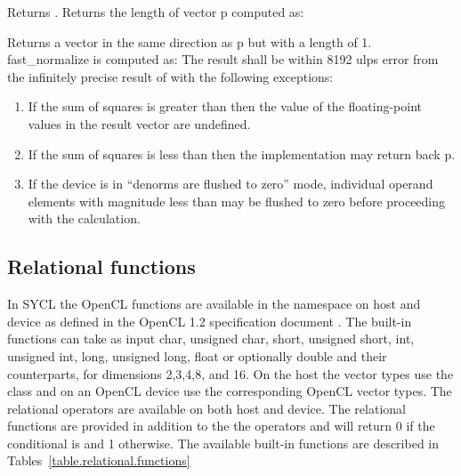{
Returns .
}
{
Returns the length of vector p computed as:
}
{
Returns a vector in the same direction as p but with a
length of 1. fast_normalize is computed as:
\newline
The result shall be within 8192 ulps error from the
infinitely precise result of
\newline
{}\newline
{}\newline
{}\newline
with the following exceptions:
\begin{enumerate}
\item If the sum of squares is greater than 
then the value of the floating-point values in the
result vector are undefined.

\item If the sum of squares is less than  then
the implementation may return back p.

\item If the device is in ``denorms are flushed to zero''
mode, individual operand elements with magnitude
less than  may be flushed to zero
before proceeding with the calculation.
\end{enumerate}
}
\completeTable

\subsection{Relational functions}

In SYCL the OpenCL  functions are available in the namespace
 on host and device as defined in the OpenCL 1.2 specification
document \cite[par. 6.12.6]{opencl12}. The built-in functions can take as input
char, unsigned char, short, unsigned short, int, unsigned int, long, unsigned
long, float or optionally double and their  counterparts, for
dimensions 2,3,4,8, and 16. On the host the vector types use
the  class and on an OpenCL device use the
corresponding OpenCL vector types.
The relational operators are available on both host and device.  The
relational functions are provided in addition to the the operators and will
return 0 if the conditional
is  and 1 otherwise.
The available built-in functions are described in
Tables~\ref{table.relational.functions}

